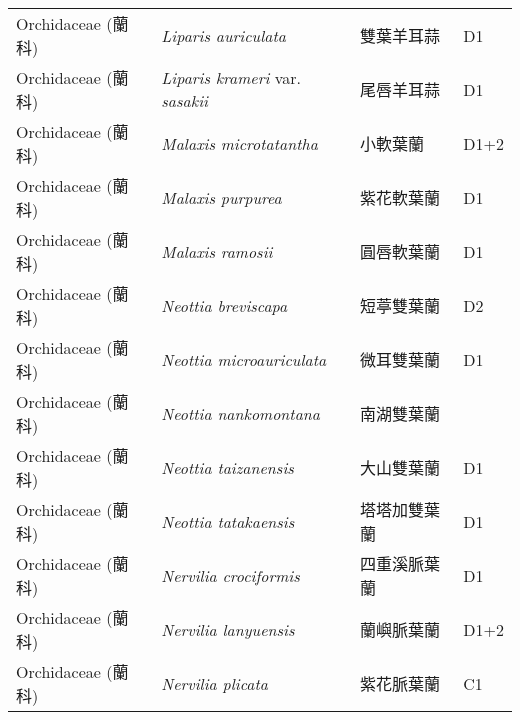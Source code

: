 \begin{longtable}{p{3cm}p{5cm}p{3cm}p{4cm}}
    Orchidaceae (蘭科) & \textit{Liparis auriculata}  & 雙葉羊耳蒜 & D1 \index{Liparis@\textit{Liparis}!auriculata@\textit{auriculata}}  \index{雙葉羊耳蒜} \\
    Orchidaceae (蘭科) & \textit{Liparis krameri} var. \textit{sasakii}  & 尾唇羊耳蒜 & D1 \index{Liparis@\textit{Liparis}!krameri@\textit{krameri}!var. sasakii@var. \textit{sasakii}}  \index{尾唇羊耳蒜} \\
    Orchidaceae (蘭科) & \textit{Malaxis microtatantha}  & 小軟葉蘭 & D1+2 \index{Malaxis@\textit{Malaxis}!microtatantha@\textit{microtatantha}}  \index{小軟葉蘭} \\
    Orchidaceae (蘭科) & \textit{Malaxis purpurea}  & 紫花軟葉蘭 & D1 \index{Malaxis@\textit{Malaxis}!purpurea@\textit{purpurea}}  \index{紫花軟葉蘭} \\
    Orchidaceae (蘭科) & \textit{Malaxis ramosii}  & 圓唇軟葉蘭 & D1 \index{Malaxis@\textit{Malaxis}!ramosii@\textit{ramosii}}  \index{圓唇軟葉蘭} \\
    Orchidaceae (蘭科) & \textit{Neottia breviscapa}  & 短葶雙葉蘭 & D2 \index{Neottia@\textit{Neottia}!breviscapa@\textit{breviscapa}}  \index{短葶雙葉蘭} \\
    Orchidaceae (蘭科) & \textit{Neottia microauriculata}  & 微耳雙葉蘭 & D1 \index{Neottia@\textit{Neottia}!microauriculata@\textit{microauriculata}}  \index{微耳雙葉蘭} \\
    Orchidaceae (蘭科) & \textit{Neottia nankomontana}  & 南湖雙葉蘭 &  \index{Neottia@\textit{Neottia}!nankomontana@\textit{nankomontana}}  \index{南湖雙葉蘭} \\
    Orchidaceae (蘭科) & \textit{Neottia taizanensis}  & 大山雙葉蘭 & D1 \index{Neottia@\textit{Neottia}!taizanensis@\textit{taizanensis}}  \index{大山雙葉蘭} \\
    Orchidaceae (蘭科) & \textit{Neottia tatakaensis}  & 塔塔加雙葉蘭 & D1 \index{Neottia@\textit{Neottia}!tatakaensis@\textit{tatakaensis}}  \index{塔塔加雙葉蘭} \\
    Orchidaceae (蘭科) & \textit{Nervilia crociformis}  & 四重溪脈葉蘭 & D1 \index{Nervilia@\textit{Nervilia}!crociformis@\textit{crociformis}}  \index{四重溪脈葉蘭} \\
    Orchidaceae (蘭科) & \textit{Nervilia lanyuensis}  & 蘭嶼脈葉蘭 & D1+2 \index{Nervilia@\textit{Nervilia}!lanyuensis@\textit{lanyuensis}}  \index{蘭嶼脈葉蘭} \\
    Orchidaceae (蘭科) & \textit{Nervilia plicata}  & 紫花脈葉蘭 & C1 \index{Nervilia@\textit{Nervilia}!plicata@\textit{plicata}}  \index{紫花脈葉蘭} \\

\end{longtable}
